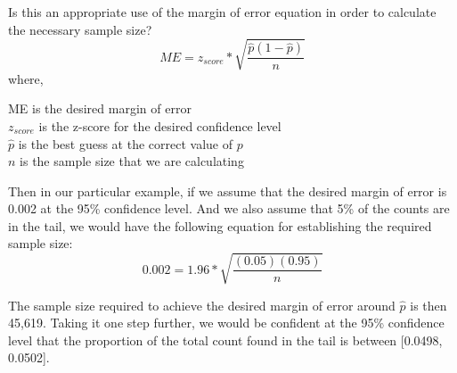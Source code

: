 \documentclass[10pt]{amsart}
\begin{document}
Is this an appropriate use of the margin of error equation in order to calculate the necessary sample size?
\begin{equation}
ME = z_{score}*\sqrt{\frac{\hat{p}(1-\hat{p})}{n}}
\end{equation}
where,
\begin{flushleft}
ME is the desired margin of error \\
$z_{score}$ is the z-score for the desired confidence level \\
$\hat{p}$ is the best guess at the correct value of $p$ \\
$n$ is the sample size that we are calculating \\ 
\end{flushleft}

Then in our particular example, if we assume that the desired margin of error is 0.002 at the 95\% confidence level.
And we also assume that 5\% of the counts are in the tail, we would have the following equation for establishing the required sample size:
\begin{equation}
0.002 = 1.96*\sqrt{\frac{(0.05)(0.95)}{n}}
\end{equation}

The sample size required to achieve the desired margin of error around $\hat{p}$ is then 45,619.
Taking it one step further, we would be confident at the 95\% confidence level that the proportion of the total count found in the tail is between [0.0498, 0.0502].
 
\end{document}

